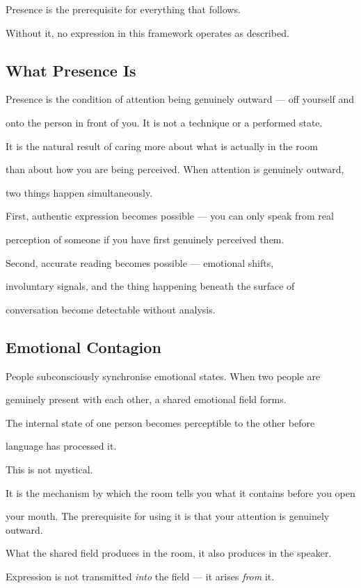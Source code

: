 Presence is the prerequisite for everything that follows.

Without it, no expression in this framework operates as described.

\subsection{What Presence Is}

Presence is the condition of attention being genuinely outward --- off yourself and

onto the person in front of you. It is not a technique or a performed state.

It is the natural result of caring more about what is actually in the room

than about how you are being perceived. When attention is genuinely outward,

two things happen simultaneously.

First, authentic expression becomes possible --- you can only speak from real

perception of someone if you have first genuinely perceived them.

Second, accurate reading becomes possible --- emotional shifts,

involuntary signals, and the thing happening beneath the surface of

conversation become detectable without analysis.

\subsection{Emotional Contagion}

People subconsciously synchronise emotional states. When two people are

genuinely present with each other, a shared emotional field forms.

The internal state of one person becomes perceptible to the other before

language has processed it.

This is not mystical.

It is the mechanism by which the room tells you what it contains before you open

your mouth. The prerequisite for using it is that your attention is genuinely outward. 

What the shared field produces in the room, it also produces in the speaker.

Expression is not transmitted \textit{into} the field --- it arises \textit{from} it.

